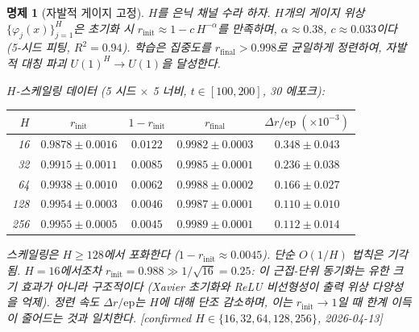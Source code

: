 \documentclass[11pt, a4paper]{article}
\theoremstyle{definition}
\theoremstyle{plain}
\newtheorem{proposition}[theorem]{명제}
\begin{document}
\begin{proposition}[자발적 게이지 고정]
\label{prop:spontaneous_gauge}
$H$를 은닉 채널 수라 하자.
$H$개의 게이지 위상 $\{\varphi_j(x)\}_{j=1}^H$은
초기화 시 $r_{\mathrm{init}} \approx 1 - c\,H^{-\alpha}$를 만족하며,
$\alpha \approx 0.38$, $c \approx 0.033$이다 (5-시드 피팅, $R^2=0.94$).
학습은 집중도를 $r_{\mathrm{final}} > 0.998$로 균일하게 정련하여,
자발적 대칭 파괴 $U(1)^H \to U(1)$을 달성한다.

\smallskip\noindent\textit{$H$-스케일링 데이터
(5 시드 $\times$ 5 너비, $t\in[100,200]$, 30 에포크):}

\smallskip
\begin{center}
\begin{tabular}{rcccc}
\toprule
$H$ & $r_{\mathrm{init}}$ & $1{-}r_{\mathrm{init}}$ &
      $r_{\mathrm{final}}$ & $\Delta r/\mathrm{ep}\;(\times 10^{-3})$ \\
\midrule
 16 & $0.9878\pm0.0016$ & $0.0122$ & $0.9982\pm0.0003$ & $0.348\pm0.043$ \\
 32 & $0.9915\pm0.0011$ & $0.0085$ & $0.9985\pm0.0001$ & $0.236\pm0.038$ \\
 64 & $0.9938\pm0.0010$ & $0.0062$ & $0.9988\pm0.0002$ & $0.166\pm0.027$ \\
128 & $0.9954\pm0.0003$ & $0.0046$ & $0.9987\pm0.0001$ & $0.110\pm0.010$ \\
256 & $0.9955\pm0.0005$ & $0.0045$ & $0.9989\pm0.0001$ & $0.112\pm0.014$ \\
\bottomrule
\end{tabular}
\end{center}

\smallskip\noindent
스케일링은 $H\ge128$에서 포화한다 ($1{-}r_{\mathrm{init}}\approx 0.0045$).
단순 $O(1/H)$ 법칙은 기각됨. $H=16$에서조차
$r_{\mathrm{init}}=0.988 \gg 1/\sqrt{16}=0.25$:
이 근접-단위 동기화는 유한 크기 효과가 아니라 \emph{구조적}이다
(Xavier 초기화와 ReLU 비선형성이 출력 위상 다양성을 억제).
정련 속도 $\Delta r/\mathrm{ep}$는 $H$에 대해 단조 감소하며,
이는 $r_{\mathrm{init}}\to 1$일 때 한계 이득이 줄어드는 것과 일치한다.
[confirmed $H{\in}\{16,32,64,128,256\}$,
2026-04-13]
\end{proposition}
\end{document}
